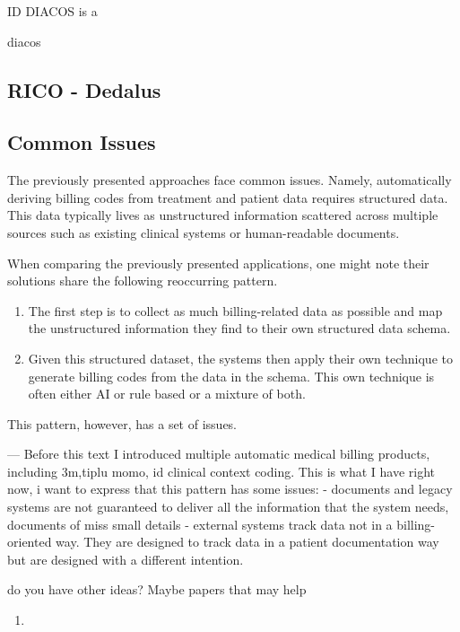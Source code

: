 ID DIACOS is a


diacos \cite{10.1007/978-3-642-82852-2_111}

\subsection{RICO - Dedalus}


\subsection{Common Issues}

The previously presented approaches face common issues.
Namely, automatically deriving billing codes from treatment and patient data requires structured data.
This data typically lives as unstructured information scattered across multiple sources such as existing clinical systems or human-readable documents.

When comparing the previously presented applications, one might note their solutions share the following reoccurring pattern.
\begin{enumerate}
    \item The first step is to collect as much billing-related data as possible and map the unstructured information they find to their own structured data schema.
    \item Given this structured dataset, the systems then apply their own technique to generate billing codes from the data in the schema.
    This own technique is often either AI or rule based or a mixture of both.
\end{enumerate}

This pattern, however, has a set of issues.

---
Before this text I introduced multiple automatic medical billing products, including 3m,tiplu momo, id clinical context coding.
This is what I have right now, i want to express that this pattern has some issues:
- documents and legacy systems are not guaranteed to deliver all the information that the system needs, documents of miss small details
- external systems track data not in a billing-oriented way. They are designed to track data in a patient documentation way but are designed with a different intention.

do you have other ideas? Maybe papers that may help


\begin{enumerate}
    \item
\end{enumerate}
